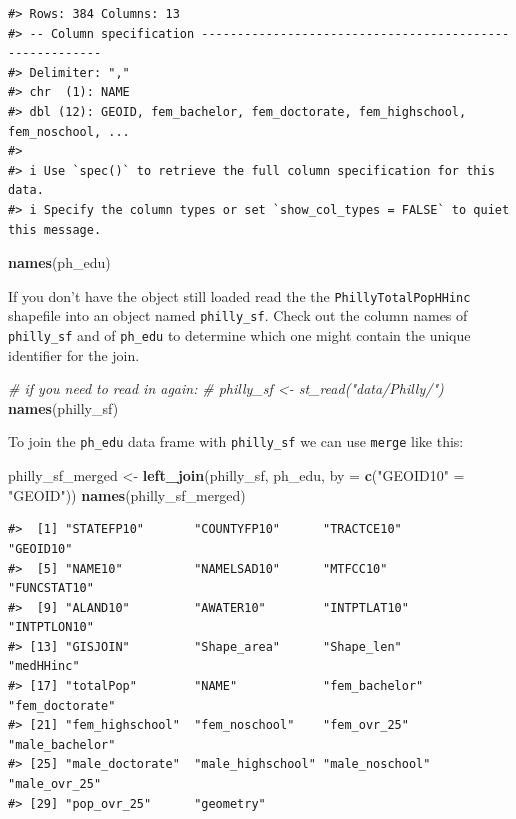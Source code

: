 \documentclass[
]{book}
\newenvironment{Shaded}{\begin{snugshade}}{\end{snugshade}}
\newcommand{\AttributeTok}[1]{\textcolor[rgb]{0.13,0.29,0.53}{#1}}
\newcommand{\CommentTok}[1]{\textcolor[rgb]{0.56,0.35,0.01}{\textit{#1}}}
\newcommand{\FunctionTok}[1]{\textcolor[rgb]{0.13,0.29,0.53}{\textbf{#1}}}
\newcommand{\NormalTok}[1]{#1}
\newcommand{\OtherTok}[1]{\textcolor[rgb]{0.56,0.35,0.01}{#1}}
\newcommand{\StringTok}[1]{\textcolor[rgb]{0.31,0.60,0.02}{#1}}
\begin{document}
\begin{verbatim}
#> Rows: 384 Columns: 13
#> -- Column specification --------------------------------------------------------
#> Delimiter: ","
#> chr  (1): NAME
#> dbl (12): GEOID, fem_bachelor, fem_doctorate, fem_highschool, fem_noschool, ...
#> 
#> i Use `spec()` to retrieve the full column specification for this data.
#> i Specify the column types or set `show_col_types = FALSE` to quiet this message.
\end{verbatim}

\begin{Shaded}
\begin{Highlighting}[]
\FunctionTok{names}\NormalTok{(ph\_edu)}
\end{Highlighting}
\end{Shaded}

If you don't have the object still loaded read the the \texttt{PhillyTotalPopHHinc} shapefile into an object named \texttt{philly\_sf}. Check out the column names of \texttt{philly\_sf} and of \texttt{ph\_edu} to determine which one might contain the unique identifier for the join.

\begin{Shaded}
\begin{Highlighting}[]
\CommentTok{\# if you need to read in again:}
\CommentTok{\# philly\_sf \textless{}{-} st\_read("data/Philly/")}
\FunctionTok{names}\NormalTok{(philly\_sf)}
\end{Highlighting}
\end{Shaded}

To join the \texttt{ph\_edu} data frame with \texttt{philly\_sf} we can use \texttt{merge} like this:

\begin{Shaded}
\begin{Highlighting}[]
\NormalTok{philly\_sf\_merged }\OtherTok{\textless{}{-}} \FunctionTok{left\_join}\NormalTok{(philly\_sf, ph\_edu, }\AttributeTok{by =} \FunctionTok{c}\NormalTok{(}\StringTok{"GEOID10"} \OtherTok{=} \StringTok{"GEOID"}\NormalTok{))}
\FunctionTok{names}\NormalTok{(philly\_sf\_merged) }
\end{Highlighting}
\end{Shaded}

\begin{verbatim}
#>  [1] "STATEFP10"       "COUNTYFP10"      "TRACTCE10"       "GEOID10"        
#>  [5] "NAME10"          "NAMELSAD10"      "MTFCC10"         "FUNCSTAT10"     
#>  [9] "ALAND10"         "AWATER10"        "INTPTLAT10"      "INTPTLON10"     
#> [13] "GISJOIN"         "Shape_area"      "Shape_len"       "medHHinc"       
#> [17] "totalPop"        "NAME"            "fem_bachelor"    "fem_doctorate"  
#> [21] "fem_highschool"  "fem_noschool"    "fem_ovr_25"      "male_bachelor"  
#> [25] "male_doctorate"  "male_highschool" "male_noschool"   "male_ovr_25"    
#> [29] "pop_ovr_25"      "geometry"
\end{verbatim}
\end{document}
